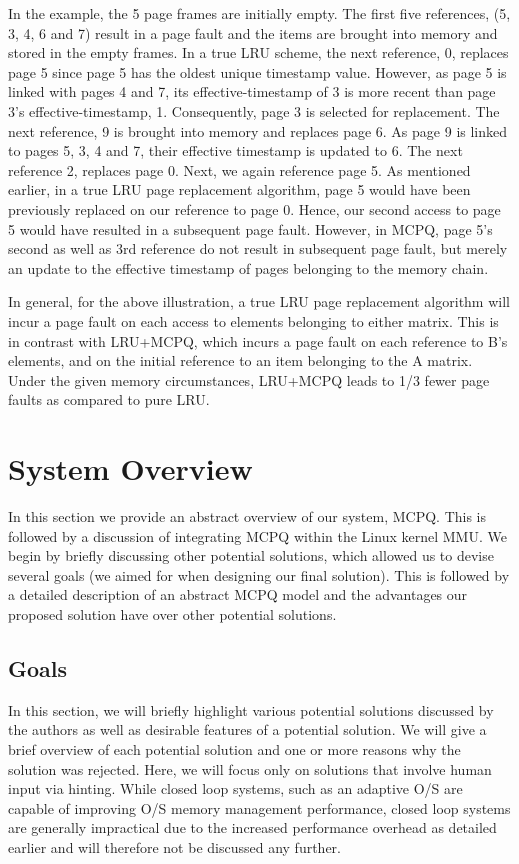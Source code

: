 \documentclass[10pt,a4paper,twocolumn]{article}
\begin{document}
In the example, the 5 page frames are initially empty. The first five references, (5, 3, 4, 6 and 7)
result in a page fault and the items are brought into memory and stored in the empty frames. In a
true LRU scheme, the next reference, 0, replaces page 5 since page 5 has the oldest unique timestamp
value. However, as page 5 is linked with pages 4 and 7, its effective-timestamp of 3 is more recent
than page 3's effective-timestamp, 1. Consequently, page 3 is selected for replacement. The next
reference, 9 is brought into memory and replaces page 6. As page 9 is linked to pages 5, 3, 4 and 7,
their effective timestamp is updated to 6. The next reference 2, replaces page 0. Next, we again
reference page 5. As mentioned earlier, in a true LRU page replacement algorithm, page 5 would have
been previously replaced on our reference to page 0. Hence, our second access to page 5 would have
resulted in a subsequent page fault. However, in MCPQ, page 5's second as well as 3rd reference do
not result in subsequent page fault, but merely an update to the effective timestamp of pages
belonging to the memory chain.



In general, for the above illustration, a true LRU page replacement algorithm will incur a page
fault on each access to elements belonging to either matrix. This is in contrast with LRU+MCPQ,
which incurs a page fault on each reference to B's elements, and on the initial reference to an item
belonging to the A matrix. Under the given memory circumstances, LRU+MCPQ leads to 1/3 fewer page
faults as compared to pure LRU.

\section{System Overview}
In this section we provide an abstract overview of our system, MCPQ. This is followed by a
discussion of integrating MCPQ within the Linux kernel MMU. We begin by briefly discussing other
potential solutions, which allowed us to devise several goals (we aimed for when designing our final
solution). This is followed by a detailed description of an abstract MCPQ model and the advantages
our proposed solution have over other potential solutions.

\subsection{Goals}
In this section, we will briefly highlight various potential solutions discussed by the authors as
well as desirable features of a potential solution. We will give a brief overview of each potential
solution and one or more reasons why the solution was rejected. Here, we will focus only on
solutions that involve human input via hinting. While closed loop systems, such as an adaptive O/S
are capable of improving O/S memory management performance, closed loop systems are generally
impractical due to the increased performance overhead as detailed earlier and will therefore not be
discussed any further.
\end{document}

